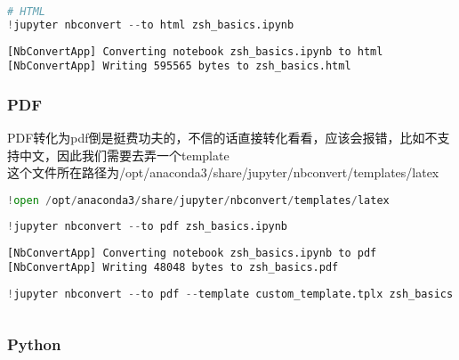 \documentclass[
]{article}
\begin{document}
\hypertarget{840690bf}{}
\begin{lstlisting}[language=Python]
# HTML
!jupyter nbconvert --to html zsh_basics.ipynb
\end{lstlisting}

\begin{lstlisting}
[NbConvertApp] Converting notebook zsh_basics.ipynb to html
[NbConvertApp] Writing 595565 bytes to zsh_basics.html
\end{lstlisting}

\hypertarget{87d51d83}{}
\hypertarget{pdf}{%
\subsubsection{PDF}\label{pdf}}

PDF转化为pdf倒是挺费功夫的，不信的话直接转化看看，应该会报错，比如不支持中文，因此我们需要去弄一个template\\
这个文件所在路径为/opt/anaconda3/share/jupyter/nbconvert/templates/latex

\hypertarget{8c8f166b}{}
\begin{lstlisting}[language=Python]
!open /opt/anaconda3/share/jupyter/nbconvert/templates/latex 
\end{lstlisting}

\hypertarget{06137370}{}
\begin{lstlisting}[language=Python]
!jupyter nbconvert --to pdf zsh_basics.ipynb
\end{lstlisting}

\begin{lstlisting}
[NbConvertApp] Converting notebook zsh_basics.ipynb to pdf
[NbConvertApp] Writing 48048 bytes to zsh_basics.pdf
\end{lstlisting}

\hypertarget{62e24bad}{}
\begin{lstlisting}[language=Python]
!jupyter nbconvert --to pdf --template custom_template.tplx zsh_basics.ipynb
\end{lstlisting}

\hypertarget{4fb50372}{}
\begin{lstlisting}[language=Python]
\end{lstlisting}

\hypertarget{d9b2b500}{}
\hypertarget{python}{%
\subsubsection{Python}\label{python}}
\end{document}
